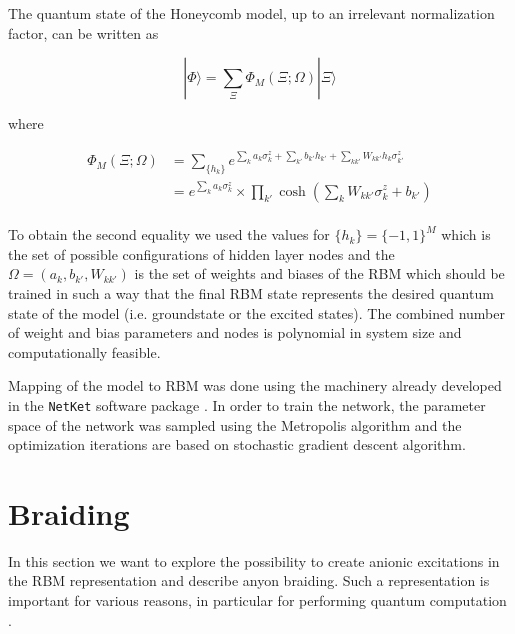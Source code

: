 \documentclass{article}
\begin{document}
The quantum state of the Honeycomb model, up to an irrelevant normalization factor, can be written as 

\begin{equation}\label{eq:19_0}
    |\Phi\rangle=\sum_{\Xi}\Phi_{M}(\Xi;\Omega)|\Xi\rangle
\end{equation}{}

where

\begin{equation}\label{eq:19_1}
    \begin{aligned}
        \Phi_{M}(\Xi;\Omega) &=  \sum_{\{h_{k}\}}e^{\sum_{k}a_{k}\sigma_{k}^{z}+\sum_{k'}b_{k'}h_{k'}+\sum_{kk'}W_{kk'}h_{k}\sigma_{k'}^{z}}\\
        &= e^{\sum_k a_k \sigma_k^z} \times \prod_{k'} \cosh \left(\sum_k W_{kk'} \sigma_k^z + b_{k'} \right)
    \end{aligned}
\end{equation}\\

To obtain the second equality we used the values for $\{h_{k}\}=\{-1,1\}^{M}$ which is the set of possible configurations of hidden layer nodes and the $\Omega=(a_{k},b_{k'},W_{kk'})$ is the set of weights and biases of the RBM which should be trained in such a way that the final RBM state represents the desired quantum state of the model (i.e. groundstate or the excited states). The combined number of weight and bias parameters and nodes is polynomial in system size and computationally feasible.


Mapping of the model to RBM was done using the machinery already developed in the \texttt{NetKet} software package \cite{netket:2019}. In order to train the network, the parameter space of the network was sampled using the Metropolis algorithm and the optimization iterations are based on stochastic gradient descent algorithm. 

\section{Braiding}\label{sec4}

In this section we want to explore the possibility to create anionic excitations in the RBM representation and describe anyon braiding. Such a representation is important for various reasons, in particular for performing quantum computation \cite{Nayak_2008}. 
\end{document}
